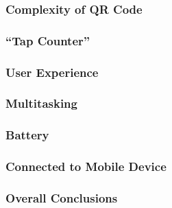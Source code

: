 \subsubsection{Complexity of QR Code}

\subsubsection{``Tap Counter''}

\subsubsection{User Experience}

\subsubsection{Multitasking}

\subsubsection{Battery}

\subsubsection{Connected to Mobile Device}

\subsubsection{Overall Conclusions}